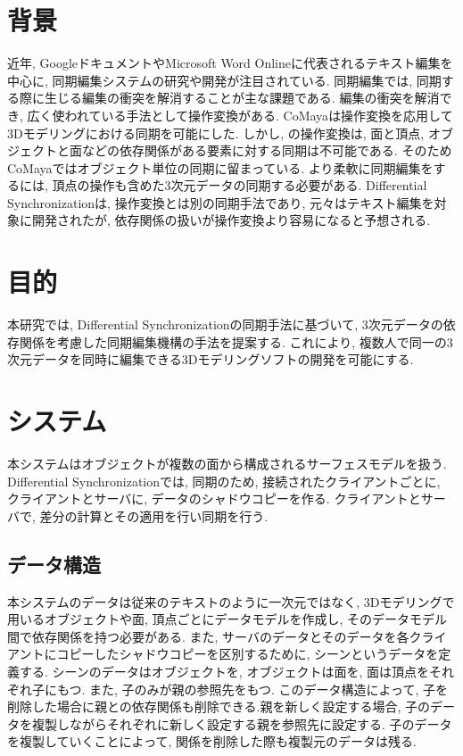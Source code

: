 \documentclass{AIabst}
\begin{document}
\makeAbstHeader
%
%
%
\section{背景}
	近年, GoogleドキュメントやMicrosoft Word Onlineに代表されるテキスト編集を中心に, 同期編集システムの研究や開発が注目されている.
	同期編集では, 同期する際に生じる編集の衝突を解消することが主な課題である.
	編集の衝突を解消でき, 広く使われている手法として操作変換がある.
	CoMaya\cite{COMAYA}は操作変換を応用して3Dモデリングにおける同期を可能にした.
	しかし, \cite{COMAYA}の操作変換は, 面と頂点, オブジェクトと面などの依存関係がある要素に対する同期は不可能である.
	そのためCoMayaではオブジェクト単位の同期に留まっている.
	より柔軟に同期編集をするには, 頂点の操作も含めた3次元データの同期する必要がある.
	Differential Synchronization\cite{DS}は, 操作変換とは別の同期手法であり, 元々はテキスト編集を対象に開発されたが, 依存関係の扱いが操作変換より容易になると予想される.
\section{目的}
 本研究では, Differential Synchronizationの同期手法に基づいて, 3次元データの依存関係を考慮した同期編集機構の手法を提案する.
  これにより, 複数人で同一の3次元データを同時に編集できる3Dモデリングソフトの開発を可能にする.
\section{システム}
 本システムはオブジェクトが複数の面から構成されるサーフェスモデルを扱う. Differential Synchronizationでは, 同期のため, 接続されたクライアントごとに, クライアントとサーバに, データのシャドウコピーを作る. クライアントとサーバで, 差分の計算とその適用を行い同期を行う.
  \subsection{データ構造}
	本システムのデータは従来のテキストのように一次元ではなく, 3Dモデリングで用いるオブジェクトや面, 頂点ごとにデータモデルを作成し, そのデータモデル間で依存関係を持つ必要がある.
  また, サーバのデータとそのデータを各クライアントにコピーしたシャドウコピーを区別するために, シーンというデータを定義する.
  シーンのデータはオブジェクトを, オブジェクトは面を, 面は頂点をそれぞれ子にもつ. また, 子のみが親の参照先をもつ.
  このデータ構造によって, 子を削除した場合に親との依存関係も削除できる.親を新しく設定する場合, 子のデータを複製しながらそれぞれに新しく設定する親を参照先に設定する.
  子のデータを複製していくことによって, 関係を削除した際も複製元のデータは残る.
\end{document}

